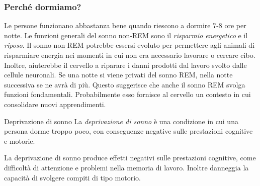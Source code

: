 \documentclass[a4paper]{article}
\begin{document}
\subsubsection{Perché dormiamo?}
Le persone funzionano abbastanza bene quando riescono a dormire \(7\)-\(8\) ore per notte. Le funzioni generali del sonno non-REM sono il \emph{risparmio energetico} e il \emph{riposo}.
Il sonno non-REM potrebbe essersi evoluto per permettere agli animali di risparmiare energia nei momenti in cui non era necessario lavorare o cercare cibo. Inoltre, aiuterebbe il cervello a riparare i danni prodotti dal lavoro svolto dalle cellule neuronali.
Se una notte si viene privati del sonno REM, nella notte successiva se ne avrà di più. Questo suggerisce che anche il sonno REM svolga funzioni fondamentali. Probabilmente esso fornisce al cervello un contesto in cui consolidare nuovi apprendimenti.
\begin{snippetdefinition}{Deprivazione di sonno}
    La \emph{deprivazione di sonno} è una condizione in cui una persona dorme troppo poco, con conseguenze negative sulle prestazioni cognitive e motorie.
\end{snippetdefinition}
La deprivazione di sonno produce effetti negativi sulle prestazioni cognitive, come difficoltà di attenzione e problemi nella memoria di lavoro. Inoltre danneggia la capacità di svolgere compiti di tipo motorio.
\end{document}
